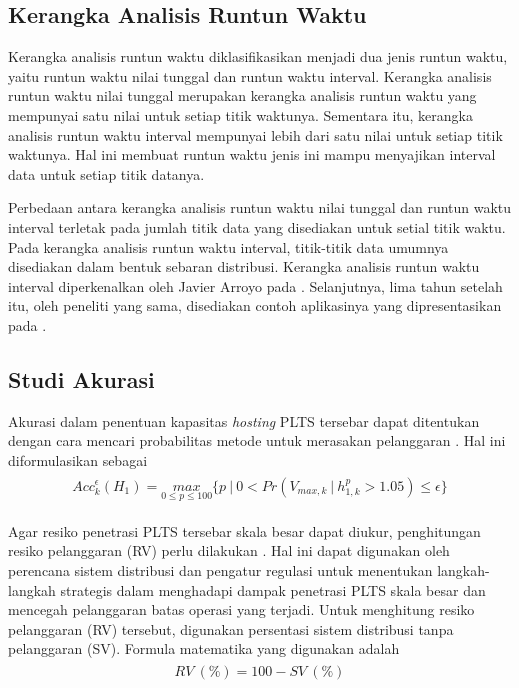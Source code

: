 {{{{{{\subsection{Kerangka Analisis Runtun Waktu}
Kerangka analisis runtun waktu diklasifikasikan menjadi dua jenis runtun waktu, yaitu runtun waktu nilai tunggal dan runtun waktu interval. Kerangka analisis runtun waktu nilai tunggal merupakan kerangka analisis runtun waktu yang mempunyai satu nilai untuk setiap titik waktunya. Sementara itu, kerangka analisis runtun waktu interval mempunyai lebih dari satu nilai untuk setiap titik waktunya. Hal ini membuat runtun waktu jenis ini mampu menyajikan interval data untuk setiap titik datanya. 

Perbedaan antara kerangka analisis runtun waktu nilai tunggal dan runtun waktu interval terletak pada jumlah titik data yang disediakan untuk setial titik waktu. Pada kerangka analisis runtun waktu interval, titik-titik data umumnya disediakan dalam bentuk sebaran distribusi. Kerangka analisis runtun waktu interval diperkenalkan oleh Javier Arroyo pada \cite{Arroyo2006}. Selanjutnya, lima tahun setelah itu, oleh peneliti yang sama, disediakan contoh aplikasinya yang dipresentasikan pada \cite{Arroyo2011}.

\subsection{Studi Akurasi}
Akurasi dalam penentuan kapasitas \textit{hosting} PLTS tersebar dapat ditentukan dengan cara mencari probabilitas metode untuk merasakan pelanggaran \cite{Dubey2017}. Hal ini diformulasikan sebagai
\begin{align}
\begin{split}\label{acc}
	Acc^{\epsilon}_k(H_1)=\underset{0\leq p \leq 100}{max}\Big\{p\ |\ 0<Pr(V_{max,k}\ |\ h^p_{1,k}>1.05)\leq \epsilon\Big\}
\end{split}
\end{align}

Agar resiko penetrasi PLTS tersebar skala besar dapat diukur, penghitungan resiko pelanggaran (RV) perlu dilakukan \cite{Torquato2018}. Hal ini dapat digunakan oleh perencana sistem distribusi dan pengatur regulasi untuk menentukan langkah-langkah strategis dalam menghadapi dampak penetrasi PLTS skala besar dan mencegah pelanggaran batas operasi yang terjadi. Untuk menghitung resiko pelanggaran (RV) tersebut, digunakan persentasi sistem distribusi tanpa pelanggaran (SV). Formula matematika yang digunakan adalah
\begin{align}
\begin{split}\label{rov}
	RV\ (\%)=100-SV\ (\%)
\end{split}
\end{align}

}}}}}}
